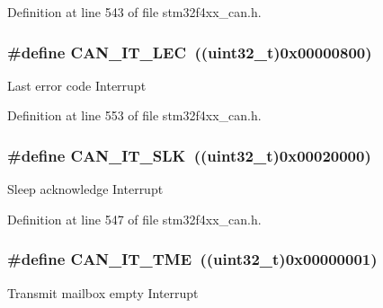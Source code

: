 Definition at line 543 of file stm32f4xx\-\_\-can.\-h.

\hypertarget{group___c_a_n__interrupts_gad670b6f001bf67f24e17d91ada50a61c}{
\subsubsection[{C\-A\-N\-\_\-\-I\-T\-\_\-\-L\-E\-C}]{\setlength{\rightskip}{0pt plus 5cm}\#define C\-A\-N\-\_\-\-I\-T\-\_\-\-L\-E\-C~((uint32\-\_\-t)0x00000800)}}\label{group___c_a_n__interrupts_gad670b6f001bf67f24e17d91ada50a61c}
Last error code Interrupt 

Definition at line 553 of file stm32f4xx\-\_\-can.\-h.

\hypertarget{group___c_a_n__interrupts_ga639d4ab2777d9a2f8b7e67071b091059}{
\subsubsection[{C\-A\-N\-\_\-\-I\-T\-\_\-\-S\-L\-K}]{\setlength{\rightskip}{0pt plus 5cm}\#define C\-A\-N\-\_\-\-I\-T\-\_\-\-S\-L\-K~((uint32\-\_\-t)0x00020000)}}\label{group___c_a_n__interrupts_ga639d4ab2777d9a2f8b7e67071b091059}
Sleep acknowledge Interrupt 

Definition at line 547 of file stm32f4xx\-\_\-can.\-h.

\hypertarget{group___c_a_n__interrupts_ga619e36230fa2eb089a7c1936b5004eb9}{
\subsubsection[{C\-A\-N\-\_\-\-I\-T\-\_\-\-T\-M\-E}]{\setlength{\rightskip}{0pt plus 5cm}\#define C\-A\-N\-\_\-\-I\-T\-\_\-\-T\-M\-E~((uint32\-\_\-t)0x00000001)}}\label{group___c_a_n__interrupts_ga619e36230fa2eb089a7c1936b5004eb9}
Transmit mailbox empty Interrupt 

